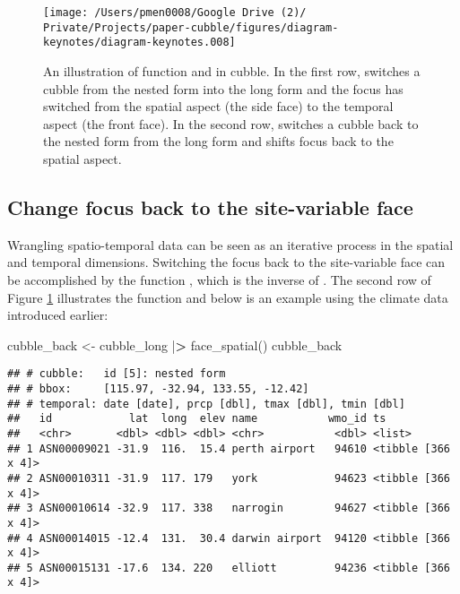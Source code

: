 \documentclass{article}
\newenvironment{Shaded}{\begin{snugshade}}{\end{snugshade}}
\newcommand{\ErrorTok}[1]{\textcolor[rgb]{0.64,0.00,0.00}{\textbf{#1}}}
\newcommand{\FunctionTok}[1]{\textcolor[rgb]{0.00,0.00,0.00}{#1}}
\newcommand{\NormalTok}[1]{#1}
\newcommand{\OtherTok}[1]{\textcolor[rgb]{0.56,0.35,0.01}{#1}}
\newcommand{\SpecialCharTok}[1]{\textcolor[rgb]{0.00,0.00,0.00}{#1}}
\begin{document}
\begin{figure}

{\centering \texttt{[image: /Users/pmen0008/Google Drive (2)/ Private/Projects/paper-cubble/figures/diagram-keynotes/diagram-keynotes.008]} 

}

\caption{An illustration of function  and  in cubble. In the first row,  switches a cubble from the nested form into the long form and the focus has switched from the spatial aspect (the side face) to the temporal aspect (the front face). In the second row,  switches a cubble back to the nested form from the long form and shifts focus back to the spatial aspect.}\label{fig:face}
\end{figure}

\hypertarget{change-focus-back-to-the-site-variable-face}{%
\subsection{Change focus back to the site-variable face}\label{change-focus-back-to-the-site-variable-face}}

Wrangling spatio-temporal data can be seen as an iterative process in the spatial and temporal dimensions. Switching the focus back to the site-variable face can be accomplished by the function , which is the inverse of . The second row of Figure \ref{fig:face} illustrates the function and below is an example using the climate data introduced earlier:

\begin{Shaded}
\begin{Highlighting}[]
\NormalTok{cubble\_back }\OtherTok{\textless{}{-}}\NormalTok{ cubble\_long }\SpecialCharTok{|}\ErrorTok{\textgreater{}} \FunctionTok{face\_spatial}\NormalTok{()}
\NormalTok{cubble\_back}
\end{Highlighting}
\end{Shaded}

\begin{verbatim}
## # cubble:   id [5]: nested form
## # bbox:     [115.97, -32.94, 133.55, -12.42]
## # temporal: date [date], prcp [dbl], tmax [dbl], tmin [dbl]
##   id            lat  long  elev name           wmo_id ts                
##   <chr>       <dbl> <dbl> <dbl> <chr>           <dbl> <list>            
## 1 ASN00009021 -31.9  116.  15.4 perth airport   94610 <tibble [366 x 4]>
## 2 ASN00010311 -31.9  117. 179   york            94623 <tibble [366 x 4]>
## 3 ASN00010614 -32.9  117. 338   narrogin        94627 <tibble [366 x 4]>
## 4 ASN00014015 -12.4  131.  30.4 darwin airport  94120 <tibble [366 x 4]>
## 5 ASN00015131 -17.6  134. 220   elliott         94236 <tibble [366 x 4]>
\end{verbatim}
\end{document}
